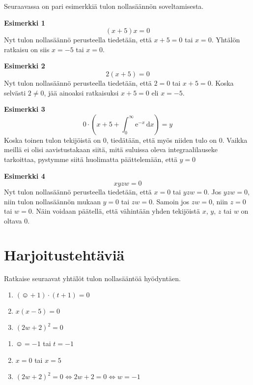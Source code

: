 Seuraavassa on pari esimerkkiä tulon nollasäännön soveltamisesta.

\textbf{Esimerkki 1}
\[(x+5)x=0\]
Nyt tulon nollasäännö perusteella tiedetään, että $x+5=0$ tai $x=0$. Yhtälön ratkaisu on siis $x=-5$ tai $x=0$.

\textbf{Esimerkki 2}
\[2(x+5)=0\]
Nyt tulon nollasäännö perusteella tiedetään, että $2=0$ tai $x+5=0$.
Koska selvästi $2\neq 0$, jää ainoaksi ratkaisuksi $x+5=0$ eli $x=-5$.

\textbf{Esimerkki 3}
\[0\cdot(x+5+\int_0^\infty \mathrm{e}^{-x}\,\mathrm{d}x)=y\]
Koska toinen tulon tekijöistä on $0$, tiedätään, että myös niiden tulo on $0$.
Vaikka meillä ei olisi aavistustakaan siitä, mitä suluissa oleva integraalilauseke tarkoittaa,
pystymme siitä huolimatta päättelemään, että $y=0$

\textbf{Esimerkki 4}
\[xyzw=0\]
Nyt tulon nollasäännö perusteella tiedetään, että $x=0$ tai $yzw=0$. Jos $yzw=0$, niin tulon nollasäännön mukaan
$y=0$ tai $zw=0$. Samoin jos $zw=0$, niin $z=0$ tai $w=0$. Näin voidaan päätellä, että
vähintään yhden tekijöistä $x$, $y$, $z$ tai $w$ on oltava $0$.

\section{Harjoitustehtäviä}
\begin{tehtava}
    Ratkaise seuraavat yhtälöt tulon nollasääntöä hyödyntäen.
    \begin{enumerate}
        \item $(\smiley{}+1)\cdot (t+1)=0$
        \item $x(x-5)=0$
        \item $(2w+2)^2=0$
    \end{enumerate}
    \begin{vastaus}
        \begin{enumerate}
            \item $\smiley{}=-1$ tai $t=-1$
            \item $x=0$ tai $x=5$
            \item $(2w+2)^2=0 \Leftrightarrow 2w+2=0 \Leftrightarrow w=-1$
        \end{enumerate}
    \end{vastaus}
\end{tehtava}